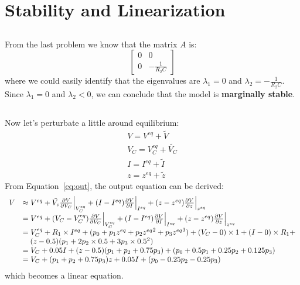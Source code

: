 \documentclass[12pt]{article}
\begin{document}
\section{Stability and Linearization}
\subsection{}
From the last problem we know that the matrix $A$ is:
\begin{equation*}
\left[\begin{array}{cc}
0 & 0\\
0 & -\frac{1}{R_2C} 
\end{array}\right]
\end{equation*}
where we could easily identify that the eigenvalues are $\lambda_1=0$ and $\lambda_2=-\frac{1}{R_2C}$. Since $\lambda_1=0$ and $\lambda_2<0$, we can conclude that the model is \textbf{marginally stable}.
\subsection{}
Now let's perturbate a little around equilibrium:
\begin{align}
V=V^{eq}+\tilde{V}\\
V_C=V_C^{eq}+\tilde{V_C}\\
I=I^{eq}+\tilde{I}\\
z=z^{eq}+\tilde{z}
\end{align}
From Equation~\ref{eq:out}, the output equation can be derived:
\begin{equation}
\begin{array}{ll}
V&\approx V^{eq}+\tilde{V_c}\frac{\partial V}{\partial V_C}\Big{|}_{V_C^{eq}}+(I-I^{eq})\frac{\partial V}{\partial I}\Big{|}_{I^{eq}}+(z-z^{eq})\frac{\partial V}{\partial z}\Big|_{z^{eq}}\\
&=V^{eq}+(V_C-V_C^{eq})\frac{\partial V}{\partial V_C}\Big{|}_{V_C^{eq}}+(I-I^{eq})\frac{\partial V}{\partial I}\Big{|}_{I^{eq}}+(z-z^{eq})\frac{\partial V}{\partial z}\Big|_{z^{eq}}\\
&=V_C^{eq}+R_1\times I^{eq}+(p_0+p_1z^{eq}+p_2{z^{eq}}^2+p_3{z^{eq}}^3)+(V_C-0)\times 1+(I-0)\times R_1+\\
&\ \ \ (z-0.5)(p_1+2p_2\times 0.5+3p_3\times 0.5^2)\\
&=V_C+0.05I+(z-0.5)(p_1+p_2+0.75p_3)+(p_0+0.5p_1+0.25p_2+0.125p_3)\\
&=V_C+(p_1+p_2+0.75p_3)z+0.05I+(p_0-0.25p_2-0.25p_3)
\end{array}
\end{equation}
which becomes a linear equation.
\end{document}

